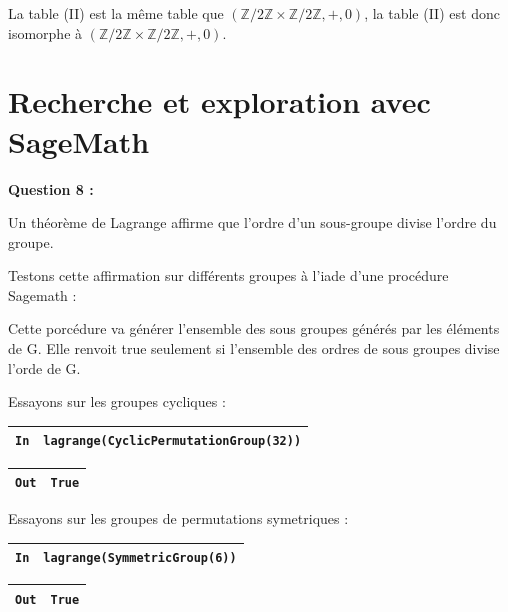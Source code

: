 \documentclass[titlepage]{article}
\begin{document}
    La table (II) est la même table que $(\mathbb{Z}/2\mathbb{Z} \times \mathbb{Z}/2\mathbb{Z}, +, 0)$, la table (II) est donc isomorphe à $(\mathbb{Z}/2\mathbb{Z} \times \mathbb{Z}/2\mathbb{Z}, +, 0)$.
    \section{Recherche et exploration avec SageMath}
    \textbf{Question 8 :}

    Un théorème de Lagrange affirme que l’ordre d’un sous-groupe divise l’ordre du groupe.

    Testons cette affirmation sur différents groupes à l'iade d'une procédure Sagemath : 

    

    Cette porcédure va générer l'ensemble des sous groupes générés par les éléments de G.
    Elle renvoit true seulement si l'ensemble des ordres de sous groupes divise l'orde de G.

    Essayons sur les groupes cycliques :

    \begin{tabularx}{11.5cm}{|p{0.60cm}|X|}
        \hline
        \verb|In|
        & 
        \verb|lagrange(CyclicPermutationGroup(32))|
        \\
        \hline
    \end{tabularx}\newline
    \begin{tabularx}{11.5cm}{|p{0.60cm}|X|}
        \hline
        \verb|Out|
        & 
        \verb|True|
        \\
        \hline
    \end{tabularx}\newline

    Essayons sur les groupes de permutations symetriques : 

    \begin{tabularx}{11.5cm}{|p{0.60cm}|X|}
        \hline
        \verb|In|
        & 
        \verb|lagrange(SymmetricGroup(6))|
        \\
        \hline
    \end{tabularx}\newline
    \begin{tabularx}{11.5cm}{|p{0.60cm}|X|}
        \hline
        \verb|Out|
        & 
        \verb|True|
        \\
        \hline
    \end{tabularx}\newline
\end{document}
